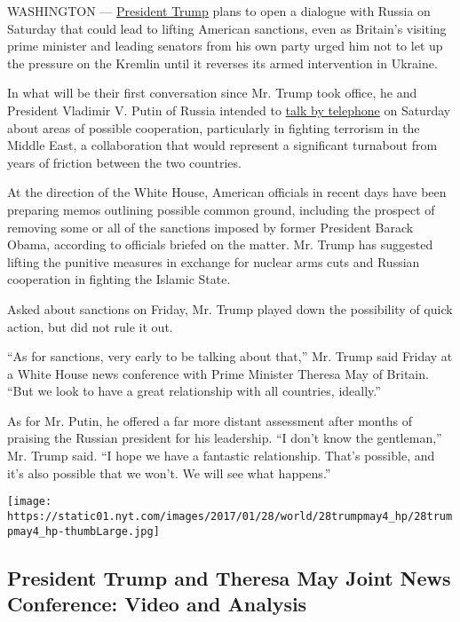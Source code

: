 WASHINGTON ---
\href{https://www.nytimes.com/topic/person/donald-trump}{President
Trump} plans to open a dialogue with Russia on Saturday that could lead
to lifting American sanctions, even as Britain's visiting prime minister
and leading senators from his own party urged him not to let up the
pressure on the Kremlin until it reverses its armed intervention in
Ukraine.

In what will be their first conversation since Mr. Trump took office, he
and President Vladimir V. Putin of Russia intended to
\href{http://www.nytimes.com/aponline/2017/01/27/world/europe/ap-eu-russia-us.html}{talk
by telephone} on Saturday about areas of possible cooperation,
particularly in fighting terrorism in the Middle East, a collaboration
that would represent a significant turnabout from years of friction
between the two countries.

At the direction of the White House, American officials in recent days
have been preparing memos outlining possible common ground, including
the prospect of removing some or all of the sanctions imposed by former
President Barack Obama, according to officials briefed on the matter.
Mr. Trump has suggested lifting the punitive measures in exchange for
nuclear arms cuts and Russian cooperation in fighting the Islamic State.

Asked about sanctions on Friday, Mr. Trump played down the possibility
of quick action, but did not rule it out.

``As for sanctions, very early to be talking about that,'' Mr. Trump
said Friday at a White House news conference with Prime Minister Theresa
May of Britain. ``But we look to have a great relationship with all
countries, ideally.''

As for Mr. Putin, he offered a far more distant assessment after months
of praising the Russian president for his leadership. ``I don't know the
gentleman,'' Mr. Trump said. ``I hope we have a fantastic relationship.
That's possible, and it's also possible that we won't. We will see what
happens.''

\href{https://www.nytimes.com/interactive/2017/01/27/us/politics/donald-trump-theresa-may-live.html}{}

\texttt{[image: https://static01.nyt.com/images/2017/01/28/world/28trumpmay4\_hp/28trumpmay4\_hp-thumbLarge.jpg]}

\hypertarget{president-trump-and-theresa-may-joint-news-conference-video-and-analysis}{%
\subsection{President Trump and Theresa May Joint News Conference: Video
and
Analysis}\label{president-trump-and-theresa-may-joint-news-conference-video-and-analysis}}

